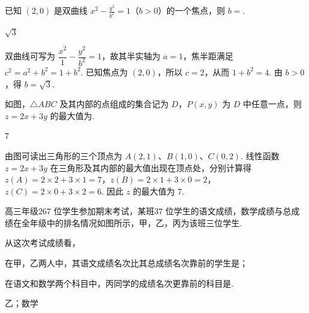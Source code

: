 \begin{problem}
已知 \((2,0)\) 是双曲线 \(x^{2} - \frac{y^{2}}{b^{2}} = 1\)（\(b > 0\)）的一个焦点，则 \(b =\)\fillinblank{}.
\end{problem}

\begin{answer}
\(\sqrt{3}\)
\end{answer}

\begin{solution}
双曲线可写为 \(\dfrac{x^2}{1}-\dfrac{y^2}{b^2}=1\)，故其半实轴为 \(a=1\)，焦半距满足 \(c^2=a^2+b^2=1+b^2\). 已知焦点为 \((2,0)\)，所以 \(c=2\)，从而 \(1+b^2=4\). 由 \(b>0\)，得 \(b=\sqrt3\).
\end{solution}

\begin{problem}
如图，\(\triangle ABC\) 及其内部的点组成的集合记为 \(D\)，\(P(x, y)\) 为 \(D\) 中任意一点，则 \(z = 2x + 3y\) 的最大值为\fillinblank{}.

\end{problem}

\begin{answer}
\(7\)
\end{answer}

\begin{solution}
由图可读出三角形的三个顶点为 \(A(2,1)\)、\(B(1,0)\)、\(C(0,2)\). 线性函数 \(z=2x+3y\) 在三角形及其内部的最大值出现在顶点处，分别计算得
\(z(A)=2\times2+3\times1=7\)，\(z(B)=2\times1+3\times0=2\)，\(z(C)=2\times0+3\times2=6\). 因此 \(z\) 的最大值为 \(7\).
\end{solution}

\begin{problem}
高三年级\(267\text{ 位}\)学生参加期末考试，某班\(37\text{ 位}\)学生的语文成绩，数学成绩与总成绩在全年级中的排名情况如图所示，甲，乙，丙为该班三位学生.

从这次考试成绩看，

\begin{circlelist}
\item 在甲，乙两人中，其语文成绩名次比其总成绩名次靠前的学生是\fillinblank{}；
\item 在语文和数学两个科目中，丙同学的成绩名次更靠前的科目是\fillinblank{}.
\end{circlelist}

\end{problem}

\begin{answer}
乙；数学
\end{answer}

